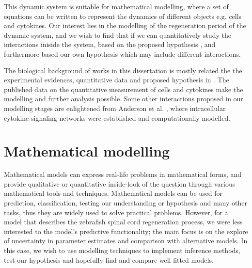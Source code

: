 This dynamic system is suitable for mathematical modelling, where a set of equations can be written to represent the dynamics of different objects e.g. cells and cytokines. Our interest lies in the modelling of the regeneration period of the dynamic system, and we wish to find that if we can quantitatively study the interactions iniside the system, based on the proposed hypothesis \cite{ref:Tsarouchas}, and furthermore based our own hypothesis which may include different interactions.

The biological background of works in this dissertation is mostly related the the experimental evidences, quantitative data and proposed hypothesis in \cite{ref:Tsarouchas}. The published data on the quantitative measurement of cells and cytokines make the modelling and further analysis possible. Some other interactions proposed in our modelling stages are enlightened from Anderson et al. \cite{Anderson}, where intracellular cytokine signaling networks were established and computationally modelled.

\section{Mathematical modelling}



Mathematical models can express real-life problems in mathematical forms, and provide qualitative or quantitative inside-look of the question through various mathematical tools and techniques. Mathematical models can be used for prediction, classification, testing our understanding or hypothesis and many other tasks, thus they are widely used to solve practical problems. However, for a model that describes the zebrafish spinal cord regeneration process, we were less interested to the model's predictive functionality; the main focus is on the explore of uncertainty in parameter estimates and comparison with alternative models. In this case, we wish to use modelling techniques to implement inference methods, test our hypothesis and hopefully find and compare well-fitted models.

